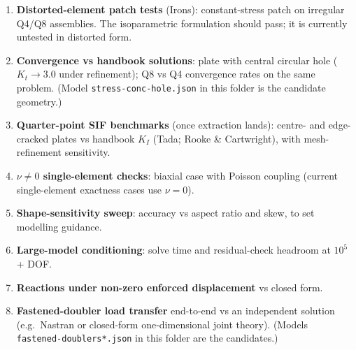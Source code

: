 \documentclass[11pt,a4paper]{article}
\begin{document}
\begin{enumerate}
  \item \textbf{Distorted-element patch tests} (Irons): constant-stress patch
        on irregular Q4/Q8 assemblies. The isoparametric formulation should
        pass; it is currently untested in distorted form.
  \item \textbf{Convergence vs handbook solutions}: plate with central
        circular hole ($K_t \to 3.0$ under refinement); Q8 vs Q4 convergence
        rates on the same problem. (Model \texttt{stress-conc-hole.json} in
        this folder is the candidate geometry.)
  \item \textbf{Quarter-point SIF benchmarks} (once extraction lands):
        centre- and edge-cracked plates vs handbook $K_I$
        (Tada; Rooke \& Cartwright), with mesh-refinement sensitivity.
  \item \textbf{$\nu \ne 0$ single-element checks}: biaxial case with Poisson
        coupling (current single-element exactness cases use $\nu = 0$).
  \item \textbf{Shape-sensitivity sweep}: accuracy vs aspect ratio and skew,
        to set modelling guidance.
  \item \textbf{Large-model conditioning}: solve time and residual-check
        headroom at $10^5$+ DOF.
  \item \textbf{Reactions under non-zero enforced displacement} vs closed form.
  \item \textbf{Fastened-doubler load transfer} end-to-end vs an independent
        solution (e.g.\ Nastran or closed-form one-dimensional joint theory).
        (Models \texttt{fastened-doublers*.json} in this folder are the
        candidates.)
\end{enumerate}
\end{document}
